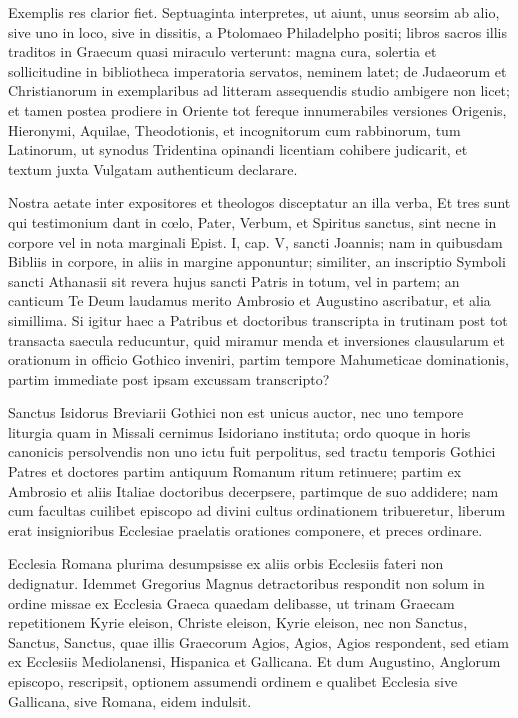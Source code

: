 \documentclass[letter,11pt]{book}
\begin{document}
Exemplis res clarior fiet. Septuaginta interpretes, ut aiunt, unus seorsim ab alio, sive uno in loco, sive in dissitis, a Ptolomaeo Philadelpho positi; libros sacros illis traditos in Graecum quasi miraculo verterunt: magna cura, solertia et sollicitudine in bibliotheca imperatoria servatos, neminem latet; de Judaeorum et Christianorum in exemplaribus ad litteram assequendis studio ambigere non licet; et tamen postea prodiere in Oriente tot fereque innumerabiles versiones Origenis, Hieronymi, Aquilae, Theodotionis, et incognitorum cum rabbinorum, tum Latinorum, ut synodus Tridentina opinandi licentiam cohibere judicarit, et textum juxta Vulgatam authenticum declarare.

Nostra aetate inter expositores et theologos disceptatur an illa verba, Et tres sunt qui testimonium dant in cœlo, Pater, Verbum, et Spiritus sanctus, sint necne in corpore vel in nota marginali Epist. I, cap. V, sancti Joannis; nam in quibusdam Bibliis in corpore, in aliis in margine apponuntur; similiter, an inscriptio Symboli sancti Athanasii sit revera hujus sancti Patris in totum, vel in partem; an canticum Te Deum laudamus merito Ambrosio et Augustino ascribatur, et alia simillima. Si igitur haec a Patribus et doctoribus transcripta in trutinam post tot transacta saecula reducuntur, quid miramur menda et inversiones clausularum et orationum in officio Gothico inveniri, partim tempore Mahumeticae dominationis, partim immediate post ipsam excussam transcripto?

Sanctus Isidorus Breviarii Gothici non est unicus auctor, nec uno tempore liturgia quam in Missali cernimus Isidoriano instituta; ordo quoque in horis canonicis persolvendis non uno ictu fuit perpolitus, sed tractu temporis Gothici Patres et doctores partim antiquum Romanum ritum retinuere; partim ex Ambrosio et aliis Italiae doctoribus decerpsere, partimque de suo addidere; nam cum facultas cuilibet episcopo ad divini cultus ordinationem tribueretur, liberum erat insignioribus Ecclesiae praelatis orationes componere, et preces ordinare.

Ecclesia Romana plurima desumpsisse ex aliis orbis Ecclesiis fateri non dedignatur. Idemmet Gregorius Magnus detractoribus respondit non solum in ordine missae ex Ecclesia Graeca quaedam delibasse, ut trinam Graecam repetitionem Kyrie eleison, Christe eleison, Kyrie eleison, nec non Sanctus, Sanctus, Sanctus, quae illis Graecorum Agios, Agios, Agios respondent, sed etiam ex Ecclesiis Mediolanensi, Hispanica et Gallicana. Et dum Augustino, Anglorum episcopo, rescripsit, optionem assumendi ordinem e qualibet Ecclesia sive Gallicana, sive Romana, eidem indulsit.
\end{document}
